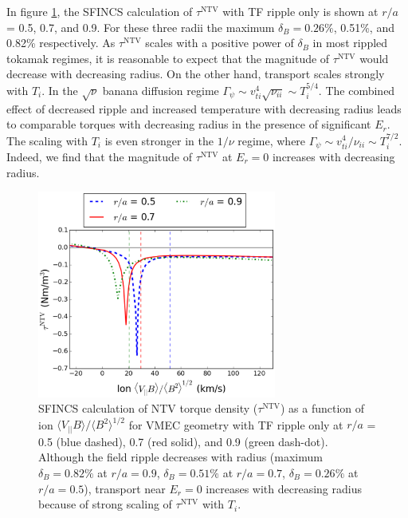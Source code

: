 \documentclass[aip, pop, preprint]{revtex4-1}
\numberwithin{figure}{section}
\numberwithin{equation}{section}
\begin{document}
In figure \ref{fig:Torque_radiusscaling}, the SFINCS calculation of $\tau^{\mathrm{NTV}}$ with TF ripple only is shown at $r/a$ = 0.5, 0.7, and 0.9. For these three radii the maximum $\delta_B = 0.26\%$,  0.51\%, and 0.82\% respectively. As $\tau^{\mathrm{NTV}}$ scales with a positive power of $\delta_B$ in most rippled tokamak regimes, it is reasonable to expect that the magnitude of $\tau^{\mathrm{NTV}}$ would decrease with decreasing radius. On the other hand, transport scales strongly with $T_i$. In the $\sqrt{\nu}$ banana diffusion regime \cite{Shaing2008} $\Gamma_{\psi} \sim v_{ti}^4 \sqrt{\nu_{ii}} \sim T_i^{5/4}$. The combined effect of decreased ripple and increased temperature with decreasing radius leads to comparable torques with decreasing radius in the presence of significant $E_r$.  The scaling with $T_i$ is even stronger in the $1/\nu$ regime,\cite{Stringer1972, Shaing2003} where $\Gamma_{\psi} \sim v_{ti}^4/\nu_{ii} \sim T_i^{7/2}$. Indeed, we find that the magnitude of $\tau^{\mathrm{NTV}}$ at $E_r = 0$ increases with decreasing radius.
 
\begin{figure}[h!]
\centering
\includegraphics[width=0.7\textwidth]{figure9.eps}
\caption{\label{fig:Torque_radiusscaling} SFINCS calculation of NTV torque density ($\tau^{\mathrm{NTV}}$) as a function of ion $\langle V_{||} B \rangle/\langle B^2 \rangle^{1/2}$ for VMEC geometry with TF ripple only at $r/a$ = 0.5 (blue dashed), 0.7 (red solid), and 0.9 (green dash-dot). Although the field ripple decreases with radius (maximum $\delta_B = 0.82\%$ at $r/a = 0.9$, $\delta_B = 0.51\%$ at $r/a = 0.7$, $\delta_B = 0.26\%$ at $r/a = 0.5$), transport near $E_r = 0$ increases with decreasing radius because of strong scaling of $\tau^{\mathrm{NTV}}$ with $T_i$.\cite{Stringer1972,Shaing2003}}
\end{figure}
\end{document}
